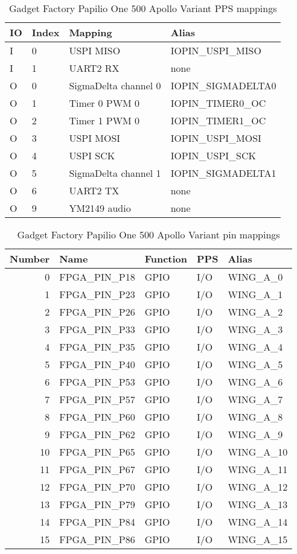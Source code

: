 \documentclass[12pt,a4paper,openany,smallheadings,headinclude,headsepline,final]{scrreprt}
\def \board {Gadget Factory Papilio One 500 Apollo Variant }
\begin{document}
\begin{table}[H]
\begin{center}
\begin{tabularx}{14cm}{lllX}

IO & Index & Mapping & Alias \\
\hline
I & 0 & USPI MISO & IOPIN\_USPI\_MISO \\
I & 1 & UART2 RX & none \\
O & 0 & SigmaDelta channel 0 & IOPIN\_SIGMADELTA0 \\
O & 1 & Timer 0 PWM 0 &  IOPIN\_TIMER0\_OC \\
O & 2 & Timer 1 PWM 0 & IOPIN\_TIMER1\_OC \\
O & 3 & USPI MOSI & IOPIN\_USPI\_MOSI \\
O & 4 & USPI SCK & IOPIN\_USPI\_SCK \\
O & 5 & SigmaDelta channel 1 & IOPIN\_SIGMADELTA1 \\
O & 6 & UART2 TX & none \\
O & 9 & YM2149 audio & none \\
\end{tabularx}
\caption{\board PPS mappings}
\end{center}
\end{table}



\begin{table}[H]
\begin{center}
\begin{tabularx}{14cm}{rlllX}
Number & Name & Function & PPS & Alias \\
\hline

0 & FPGA\_PIN\_P18 & GPIO & I/O & WING\_A\_0 \\
1 & FPGA\_PIN\_P23 & GPIO & I/O & WING\_A\_1 \\
2 & FPGA\_PIN\_P26  & GPIO & I/O & WING\_A\_2 \\
3 & FPGA\_PIN\_P33  & GPIO & I/O & WING\_A\_3 \\
4 & FPGA\_PIN\_P35  & GPIO & I/O & WING\_A\_4 \\
5 & FPGA\_PIN\_P40  & GPIO & I/O & WING\_A\_5 \\
6 & FPGA\_PIN\_P53  & GPIO & I/O & WING\_A\_6 \\
7 & FPGA\_PIN\_P57  & GPIO & I/O & WING\_A\_7 \\
8 & FPGA\_PIN\_P60  & GPIO & I/O & WING\_A\_8 \\
9 & FPGA\_PIN\_P62  & GPIO & I/O & WING\_A\_9 \\
10 & FPGA\_PIN\_P65 & GPIO & I/O & WING\_A\_10 \\
11 & FPGA\_PIN\_P67 & GPIO & I/O & WING\_A\_11 \\
12 & FPGA\_PIN\_P70 & GPIO & I/O & WING\_A\_12 \\
13 & FPGA\_PIN\_P79 & GPIO & I/O & WING\_A\_13 \\
14 & FPGA\_PIN\_P84 & GPIO & I/O & WING\_A\_14 \\
15 & FPGA\_PIN\_P86 & GPIO & I/O & WING\_A\_15
\end{tabularx}
\caption{\board pin mappings}
\end{center}
\end{table}
\end{document}
